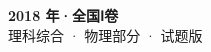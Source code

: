 \documentclass[zihao=-4, a4paper]{ctexart}
\begin{document}
\begin{center}
  {\Large\bfseries 2018 年·全国Ⅰ卷}\\[4pt]
  {\large 理科综合 · 物理部分 · 试题版}
\end{center}
\medskip
{}

\end{document}
